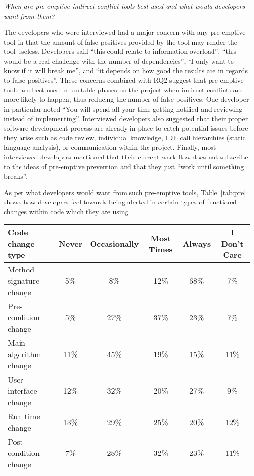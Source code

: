 \documentclass[conference]{IEEEtran}
\begin{document}
\begin{description}[topsep=6pt]
	\item[RQ6] \textit{When are pre-emptive indirect conflict tools best used and what would developers want from them?}
\end{description}

The developers who were interviewed had a major concern with any pre-emptive tool in that the amount of false positives
provided by the tool may render the tool useless. Developers said ``this could relate to information overload'', ``this would
be a real challenge with the number of dependencies'', ``I only want to know if it will break me'', and ``it depends on how
good the results are in regards to false positives''. These concerns combined with RQ2 suggest that pre-emptive tools are
best used in unstable phases on the project when indirect conflicts are more likely to happen, thus reducing the number of false
positives. One developer in particular noted ``You will spend all your time getting notified and reviewing instead of implementing''.
Interviewed developers also suggested that their proper software development process are already in place to
catch potential issues before they arise such as code review, individual knowledge, IDE call hierarchies (static language analysis),
or communication within the project. Finally, most interviewed developers mentioned that their current work flow does
not subscribe to the ideas of pre-emptive prevention and that they just ``work until something breaks''. 

As per what developers would want from such pre-emptive tools, Table~\ref{tab:pre} shows how developers feel towards being 
alerted in certain types of functional changes within code which they are using.

\begin{table*}[tb!]
\begin{center}
\begin{tabular}{| p{7cm} | c | c | c | c | c |}
\hline
Code change type &Never  & Occasionally & Most Times & Always & I Don't Care \\
\hline
\hline
Method signature change & 5\% & 8\% & 12\% & 68\% & 7\% \\ \hline
Pre-condition change & 5\% & 27\% & 37\% & 23\% & 7\% \\ \hline
Main algorithm change & 11\% & 45\% & 19\% & 15\% & 11\% \\ \hline
User interface change & 12\% & 32\% & 20\% & 27\% & 9\% \\ \hline
Run time change & 13\% & 29\% & 25\% & 20\% & 12\% \\ \hline
Post-condition change & 7\% & 28\% & 32\% & 23\% & 11\% \\ \hline
\end{tabular}
\end{center}
\caption{Results of survey questions to source code changes that developers deem notification worthy, in terms of percentage
of developers surveyed.\label{tab:pre}}
\end{table*}
\end{document}
